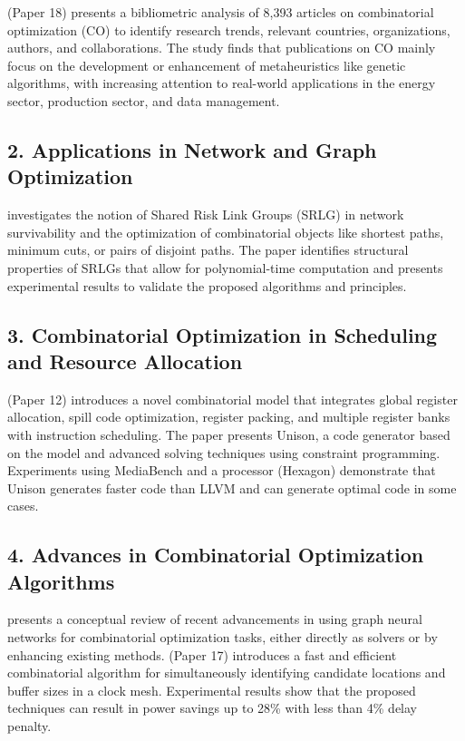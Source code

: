 \documentclass{article}
\begin{document}
(Paper 18) presents a bibliometric analysis of 8,393 articles on combinatorial optimization (CO) to identify research trends, relevant countries, organizations, authors, and collaborations. The study finds that publications on CO mainly focus on the development or enhancement of metaheuristics like genetic algorithms, with increasing attention to real-world applications in the energy sector, production sector, and data management.

\subsection{2. Applications in Network and Graph Optimization}

\cite{Coudert2016CombinatorialOI} investigates the notion of Shared Risk Link Groups (SRLG) in network survivability and the optimization of combinatorial objects like shortest paths, minimum cuts, or pairs of disjoint paths. The paper identifies structural properties of SRLGs that allow for polynomial-time computation and presents experimental results to validate the proposed algorithms and principles.

\subsection{3. Combinatorial Optimization in Scheduling and Resource Allocation}

(Paper 12) introduces a novel combinatorial model that integrates global register allocation, spill code optimization, register packing, and multiple register banks with instruction scheduling. The paper presents Unison, a code generator based on the model and advanced solving techniques using constraint programming. Experiments using MediaBench and a processor (Hexagon) demonstrate that Unison generates faster code than LLVM and can generate optimal code in some cases.

\subsection{4. Advances in Combinatorial Optimization Algorithms}

\cite{Cappart2021CombinatorialOA} presents a conceptual review of recent advancements in using graph neural networks for combinatorial optimization tasks, either directly as solvers or by enhancing existing methods. (Paper 17) introduces a fast and efficient combinatorial algorithm for simultaneously identifying candidate locations and buffer sizes in a clock mesh. Experimental results show that the proposed techniques can result in power savings up to 28\% with less than 4\% delay penalty.
\end{document}
